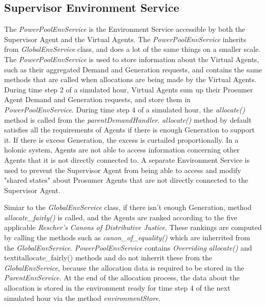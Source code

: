 \subsection*{Supervisor Environment Service}
The \textit{PowerPoolEnvService} is the Environment Service accessible by both the Supervisor Agent and the Virtual Agents. The \textit{PowerPoolEnvService} inherits from \textit{GlobalEnvService} class, and does a lot of the same things on a smaller scale.  The \textit{PowerPoolEnvService} is used to store information about the Virtual Agents, such as their aggregated Demand and Generation requests, and contains the same methods that are called when allocations are being made by the Virtual Agents. During time step 2 of a simulated hour, Virtual Agents sum up their Prosumer Agent Demand and Generation requests, and store them in \textit{PowerPoolEnvService}. During time step 4 of a simulated hour, the \textit{allocate()} method is called from the \textit{parentDemandHandler}. \textit{allocate()} method by default satisfies all the requirements of Agents if there is enough Generation to support it. If there is excess Generation, the excess is curtailed proportionally. In a holonic system, Agents are not able to access information concerning other Agents that it is not directly connected to. A separate Environment Service is used to prevent the Supervisor Agent from being able to access and modify "shared states" about Prosumer Agents that are not directly connected to the Supervisor Agent.

Simiar to the \textit{GlobalEnvService} class, if there isn't enough Generation, method \textit{allocate\_fairly()} is called, and the Agents are ranked according to the five applicable \textit{Rescher's Canons of Distributive Justice}. These rankings are computed by calling the methods such as \textit{canon\_of\_equality()} which are inherrited from the \textit{GlobalEnvService}. \textit{PowerPoolEnvService} contains \textit{Overriding} \textit{allocate()} and textit{allocate\_fairly()} methods and do not inherrit these from the \textit{GlobalEnvService}, because the allocation data is required to be stored in the \textit{ParentEnvService}. At the end of the allocation process, the data about the allocation is stored in the environment ready for time step 4 of the next simulated hour via the method \textit{environmentStore}.

